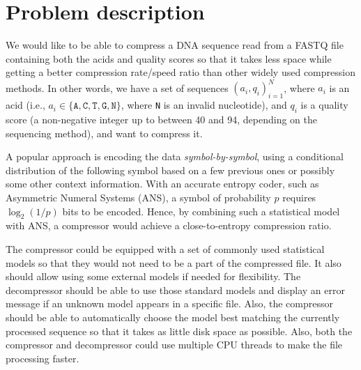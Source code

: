 \section{Problem description}\label{sec:problem-description}

We would like to be able to compress a DNA sequence read from a
FASTQ\cite{fastq} file containing both the acids and quality scores so that
it takes less space while getting a better compression rate/speed ratio than
other widely used compression methods.
In other words, we have a set of sequences \((a_i, q_i)_{i=1}^N\), where \(a_i\)
is an acid (i.e., $a_i \in \{\mathtt{A}, \mathtt{C}, \mathtt{T}, \mathtt{G},
\mathtt{N}\}$, where \texttt{N} is an invalid nucleotide), and \(q_i\) is a
quality score (a non-negative integer up to between 40 and 94, depending on
the sequencing method), and want to compress it.

A popular approach is encoding the data \emph{symbol-by-symbol}, using a
conditional
distribution of the following symbol based on a few previous ones or possibly
some other context information.
With an accurate entropy coder, such as Asymmetric Numeral Systems (ANS)\cite{7170048}, a
symbol of probability \(p\) requires \(\log_2(1/p)\) bits to be encoded.
Hence, by combining such a statistical model with ANS, a compressor would
achieve a close-to-entropy compression ratio.

The compressor could be equipped with a set of commonly used statistical
models so that they would not need to be a part of the compressed file.
It also should allow using some external models if needed for flexibility.
The decompressor should be able to use those standard models and display an
error message if an unknown model appears in a specific file.
Also, the compressor should be able to automatically choose the model best
matching the currently processed sequence so that it takes as little disk
space as possible.
Also, both the compressor and decompressor could use multiple CPU threads to
make the file processing faster.
